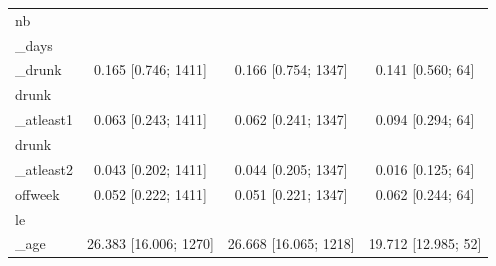 \begin{tabular}{lccc}
nb\\_days\\_drunk & 0.165 [0.746; 1411] & 0.166 [0.754; 1347] & 0.141 [0.560; 64] \\
drunk\\_atleast1 & 0.063 [0.243; 1411] & 0.062 [0.241; 1347] & 0.094 [0.294; 64] \\
drunk\\_atleast2 & 0.043 [0.202; 1411] & 0.044 [0.205; 1347] & 0.016 [0.125; 64] \\
offweek & 0.052 [0.222; 1411] & 0.051 [0.221; 1347] & 0.062 [0.244; 64] \\
le\\_age & 26.383 [16.006; 1270] & 26.668 [16.065; 1218] & 19.712 [12.985; 52] \\
\hline
\end{tabular}
